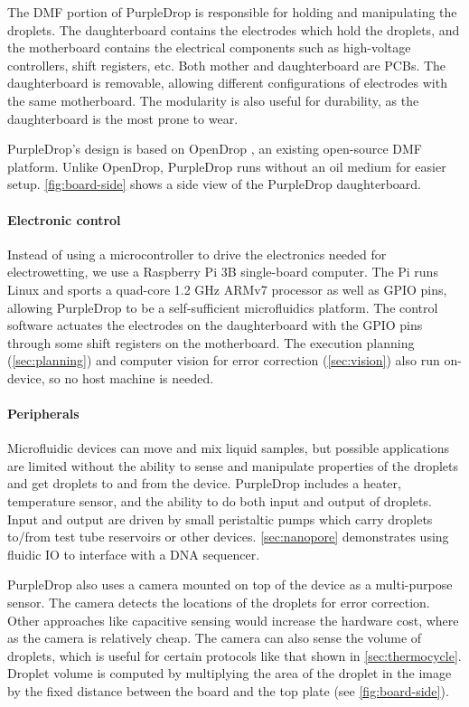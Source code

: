 \documentclass[sigconf, screen]{acmart}
\begin{document}
The DMF portion of PurpleDrop is responsible for holding and manipulating the droplets.
The daughterboard contains the electrodes which hold the droplets, and the motherboard contains the electrical components such as high-voltage controllers, shift registers, etc.
Both mother and daughterboard are PCBs.
The daughterboard is removable, allowing different configurations of electrodes with the same motherboard.
The modularity is also useful for durability, as the daughterboard is the most prone to wear.

PurpleDrop's design is based on OpenDrop \cite{opendrop}, an existing open-source DMF platform.
Unlike OpenDrop, PurpleDrop runs without an oil medium for easier setup.
\autoref{fig:board-side} shows a side view of the PurpleDrop daughterboard.

\paragraph{Electronic control}

Instead of using a microcontroller to drive the electronics needed for electrowetting, we use a Raspberry Pi 3B \cite{raspberry-pi-3b} single-board computer.
The Pi runs Linux and sports a quad-core 1.2 GHz ARMv7 processor as well as GPIO pins, allowing PurpleDrop to be a self-sufficient microfluidics platform.
The control software actuates the electrodes on the daughterboard with the GPIO pins through some shift registers on the motherboard.
The execution planning (\autoref{sec:planning}) and computer vision for error correction (\autoref{sec:vision}) also run on-device, so no host machine is needed.

\paragraph{Peripherals}

Microfluidic devices can move and mix liquid samples, but possible applications are limited without the ability to sense and manipulate properties of the droplets and get droplets to and from the device.
PurpleDrop includes a heater, temperature sensor, and the ability to do both input and output of droplets.
Input and output are driven by small peristaltic pumps which carry droplets to/from test tube reservoirs or other devices.
\autoref{sec:nanopore} demonstrates using fluidic IO to interface with a DNA sequencer.

PurpleDrop also uses a camera mounted on top of the device as a multi-purpose sensor.
The camera detects the locations of the droplets for error correction.
Other approaches like capacitive sensing \cite{bhattacharjee2012capacitance} would increase the hardware cost, where as the camera is relatively cheap.
The camera can also sense the volume of droplets, which is useful for certain protocols like that shown in \autoref{sec:thermocycle}.
Droplet volume is computed by multiplying the area of the droplet in the image by the fixed distance between the board and the top plate (see \autoref{fig:board-side}).
\end{document}
